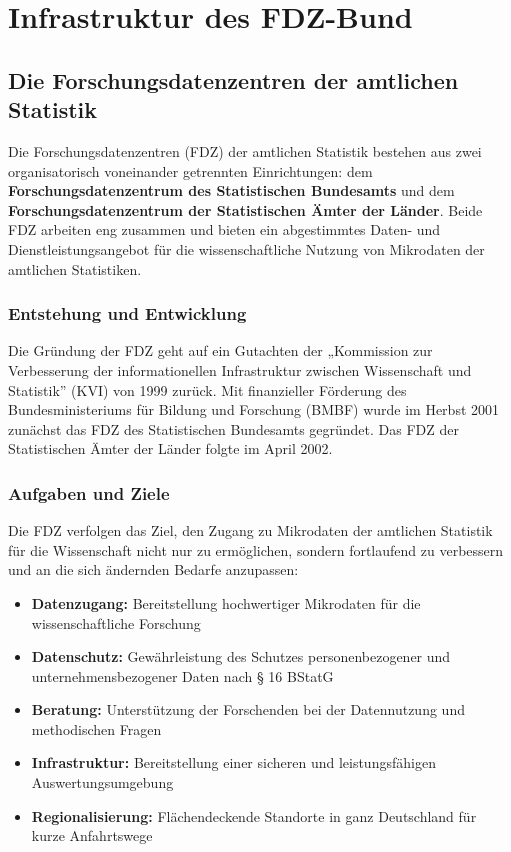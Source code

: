 \documentclass[
  ngerman,
  10pt,
  letterpaper,
  twocolumn]{book}
\providecommand{\tightlist}{%
  \setlength{\itemsep}{0pt}\setlength{\parskip}{0pt}}
\begin{document}

\chapter{Infrastruktur des FDZ-Bund}\label{sec-infrastruktur}

\section{Die Forschungsdatenzentren der amtlichen
Statistik}\label{die-forschungsdatenzentren-der-amtlichen-statistik}

Die Forschungsdatenzentren (FDZ) der amtlichen Statistik bestehen aus
zwei organisatorisch voneinander getrennten Einrichtungen: dem
\textbf{Forschungsdatenzentrum des Statistischen Bundesamts} und dem
\textbf{Forschungsdatenzentrum der Statistischen Ämter der Länder}.
Beide FDZ arbeiten eng zusammen und bieten ein abgestimmtes Daten- und
Dienstleistungsangebot für die wissenschaftliche Nutzung von Mikrodaten
der amtlichen Statistiken.

\subsection{Entstehung und
Entwicklung}\label{entstehung-und-entwicklung}

Die Gründung der FDZ geht auf ein Gutachten der „Kommission zur
Verbesserung der informationellen Infrastruktur zwischen Wissenschaft
und Statistik'' (KVI) von 1999 zurück. Mit finanzieller Förderung des
Bundesministeriums für Bildung und Forschung (BMBF) wurde im Herbst 2001
zunächst das FDZ des Statistischen Bundesamts gegründet. Das FDZ der
Statistischen Ämter der Länder folgte im April 2002.

\subsection{Aufgaben und Ziele}\label{aufgaben-und-ziele}

Die FDZ verfolgen das Ziel, den Zugang zu Mikrodaten der amtlichen
Statistik für die Wissenschaft nicht nur zu ermöglichen, sondern
fortlaufend zu verbessern und an die sich ändernden Bedarfe anzupassen:

\begin{itemize}
\tightlist
\item
  \textbf{Datenzugang:} Bereitstellung hochwertiger Mikrodaten für die
  wissenschaftliche Forschung
\item
  \textbf{Datenschutz:} Gewährleistung des Schutzes personenbezogener
  und unternehmensbezogener Daten nach § 16 BStatG
\item
  \textbf{Beratung:} Unterstützung der Forschenden bei der Datennutzung
  und methodischen Fragen
\item
  \textbf{Infrastruktur:} Bereitstellung einer sicheren und
  leistungsfähigen Auswertungsumgebung
\item
  \textbf{Regionalisierung:} Flächendeckende Standorte in ganz
  Deutschland für kurze Anfahrtswege
\end{itemize}
\end{document}

